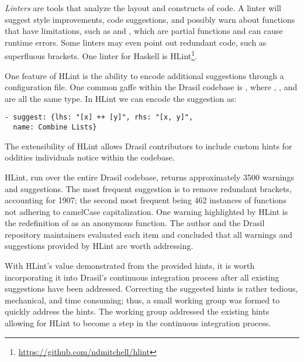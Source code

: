 {{{{{\textit{Linters} are tools that analyze the layout and constructs of code. A linter will suggest style improvements, code suggestions, and possibly warn about functions that have limitations, such as  and , which are partial functions and can cause runtime errors. Some linters may even point out redundant code, such as superfluous brackets. One linter for Haskell is HLint\footnote{\url{https://github.com/ndmitchell/hlint}}.

One feature of HLint is the ability to encode additional suggestions through a configuration file. One common gaffe within the Drasil codebase is \haskell{[a] ++ [b] ++ [c]}, where , , and  are all the same type. In HLint we can encode the suggestion as:

\begin{tcolorbox}
\begin{verbatim}
- suggest: {lhs: "[x] ++ [y]", rhs: "[x, y]",
  name: Combine Lists}
\end{verbatim}
\end{tcolorbox}

The extensibility of HLint allows Drasil contributors to include custom hints for oddities individuals notice within the codebase.

HLint, run over the entire Drasil codebase, returns approximately 3500 warnings and suggestions. The most frequent suggestion is to remove redundant brackets, accounting for 1907; the second most frequent being 462 instances of functions not adhering to camelCase capitalization. One warning highlighted by HLint is the redefinition of  as an anonymous function. The author and the Drasil repository maintainers evaluated each item and concluded that all warnings and suggestions provided by HLint are worth addressing.

With HLint's value demonstrated from the provided hints, it is worth incorporating it into Drasil's continuous integration process after all existing suggestions have been addressed. Correcting the suggested hints is rather tedious, mechanical, and time consuming; thus, a small working group was formed to quickly address the hints. The working group addressed the existing hints allowing for HLint to become a step in the continuous integration process.

}}}}}
